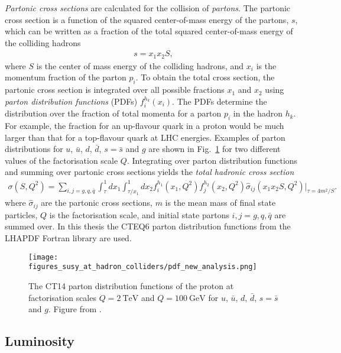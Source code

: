 \documentclass[twoside,english]{uiofysmaster}
\begin{document}
{\textit{Partonic cross sections} are calculated for the collision of \textit{partons}. The partonic cross section is a function of the squared center-of-mass energy of the partons, $s$, which can be written as a fraction of the total squared center-of-mass energy of the colliding hadrons
\begin{align}
s = x_1 x_2 S,
\end{align}
where $S$ is the center of mass energy of the colliding hadrons, and $x_i$ is the momentum fraction of the parton $p_i$. To obtain the total cross section, the partonic cross section is integrated over all possible fractions $x_1$ and $x_2$ using \textit{parton distribution functions} (PDFs) $f_i^{h_k}(x_i)$. The PDFs determine the distribution over the fraction of total momenta for a parton $p_i$ in the hadron $h_k$. For example, the fraction for an up-flavour quark in a proton would be much larger than that for a top-flavour quark at LHC energies. Examples of parton distributions for $u$, $\bar{u}$, $d$, $\bar{d}$, $s=\bar{s}$ and $g$ are shown in Fig.~\ref{Fig:: susy hadron : PDFs} for two different values of the factorisation scale $Q$. Integrating over parton distribution functions and summing over partonic cross sections yields the \textit{total hadronic cross section}
\begin{align}
\sigma(S, Q^2) = \sum_{i,j=g, q, \bar{q}} \int_{\tau}^1dx_1 \int_{\tau/x_1}^1 dx_2 f_i^{h_1} (x_1, Q^2) f_j^{h_2}(x_2, Q^2) \hat{\sigma}_{ij} (x_1x_2S, Q^2)\Big|_{\tau=4m^2/S}.
\end{align}
where $\hat{\sigma}_{ij}$ are the partonic cross sections, $m$ is the mean mass of final state particles, $Q$ is the factorisation scale, and initial state partons $i,j=g,q, \bar{q}$ are summed over.  In this thesis the CTEQ6 parton distribution functions from the LHAPDF Fortran library \cite{PhysRevD.78.013004} are used. 

\begin{figure}
\centering
\texttt{[image: figures\_susy\_at\_hadron\_colliders/pdf\_new\_analysis.png]}
\caption{The CT14 parton distribution functions of the proton at factorisation scales $Q=2~\mathrm{TeV}$ and $Q=100~\mathrm{GeV}$ for $u$, $\bar{u}$, $d$, $\bar{d}$, $s=\bar{s}$ and $g$.  Figure from \cite{dulat2016new}.}
\label{Fig:: susy hadron : PDFs}
\end{figure}




\subsection{Luminosity}

}
\end{document}
